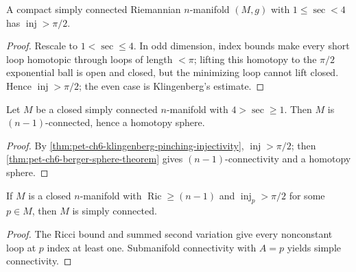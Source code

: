 \begin{theorem}
  \label{thm:pet-ch6-klingenberg-pinching-injectivity}


  A compact simply connected Riemannian $n$-manifold $(M,g)$ with
  $1\le\sec<4$ has $\operatorname{inj}>\pi/2$.
\end{theorem}
\begin{proof}
  \sketch
  Rescale to \(1<\sec\le4\). In odd dimension, index bounds make every short loop homotopic through loops of length \(<\pi\); lifting this homotopy to the \(\pi/2\) exponential ball is open and closed, but the minimizing loop cannot lift closed. Hence \(\operatorname{inj}>\pi/2\); the even case is Klingenberg's estimate.
\end{proof}

\begin{corollary}
  \label{cor:pet-ch6-rauch-berger-klingenberg-sphere}


  Let $M$ be a closed simply connected $n$-manifold with $4>\sec\ge1$. Then
  $M$ is $(n-1)$-connected, hence a homotopy sphere.
\end{corollary}
\begin{proof}
  \sketch
  By \cref{thm:pet-ch6-klingenberg-pinching-injectivity}, \(\operatorname{inj}>\pi/2\); then \cref{thm:pet-ch6-berger-sphere-theorem} gives \((n-1)\)-connectivity and a homotopy sphere.
\end{proof}

\begin{corollary}
  \label{cor:pet-ch6-ricci-simply-connected}


  If $M$ is a closed $n$-manifold with $\operatorname{Ric}\ge(n-1)$ and $\operatorname{inj}_p>\pi/2$
  for some $p\in M$, then $M$ is simply connected.
\end{corollary}
\begin{proof}
  \sketch
  The Ricci bound and summed second variation give every nonconstant loop at \(p\) index at least one. Submanifold connectivity with \(A={p}\) yields simple connectivity.
\end{proof}

